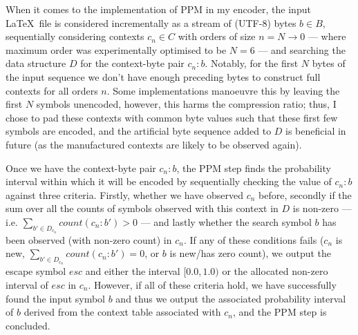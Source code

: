 \documentclass[a4paper, 11pt]{article}
\begin{document}
When it comes to the implementation of PPM in my encoder, the input \LaTeX\ file is considered incrementally as a stream of (UTF-8) bytes $b \in B$, sequentially considering contexts $c_{n} \in C$ with orders of size $n = N \to 0$ --- where maximum order was experimentally optimised to be $N = 6$ --- and searching the data structure $D$ for the context-byte pair $c_{n} \colon b$. Notably, for the first $N$ bytes of the input sequence we don’t have enough preceding bytes to construct full contexts for all orders $n$. Some implementations manoeuvre this by leaving the first $N$ symbols unencoded, however, this harms the compression ratio; thus, I chose to pad these contexts with common byte values such that these first few symbols are encoded, and the artificial byte sequence added to $D$ is beneficial in future (as the manufactured contexts are likely to be observed again).

Once we have the context-byte pair $c_{n} \colon b$, the PPM step finds the probability interval within which it will be encoded by sequentially checking the value of $c_{n} \colon b$ against three criteria. Firstly, whether we have observed $c_{n}$ before, secondly if the sum over all the counts of symbols observed with this context in $D$ is non-zero --- i.e. $\sum_{b' \in D_{c_{n}}} count(c_{n} \colon b') > 0$ --- and lastly whether the search symbol $b$ has been observed (with non-zero count) in $c_{n}$. If any of these conditions fails ($c_{n}$ is new, $\sum_{b' \in D_{c_{n}}} count(c_{n} \colon b') = 0$, or $b$ is new/has zero count), we output the escape symbol $esc$ and either the interval $[0.0, 1.0)$ or the allocated non-zero interval of $esc$ in $c_{n}$. However, if all of these criteria hold, we have successfully found the input symbol $b$ and thus we output the associated probability interval of $b$ derived from the context table associated with $c_{n}$, and the PPM step is concluded.
\end{document}
